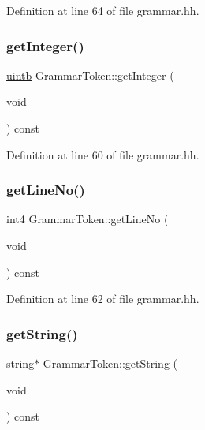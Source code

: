 Definition at line 64 of file grammar.\+hh.

\mbox{\label{class_grammar_token_a69d5c6bd5a21ce2d08a3c7152cf1042f}} 
\subsubsection{\texorpdfstring{getInteger()}{getInteger()}}
{\footnotesize\ttfamily \mbox{\hyperlink{types_8h_a2db313c5d32a12b01d26ac9b3bca178f}{uintb}} Grammar\+Token\+::get\+Integer (\begin{DoxyParamCaption}\item[{void}]{ }\end{DoxyParamCaption}) const\hspace{0.3cm}{\ttfamily [inline]}}



Definition at line 60 of file grammar.\+hh.

\mbox{\label{class_grammar_token_adf9f3d1a7dec07c74cd17bf47b3860fa}} 
\subsubsection{\texorpdfstring{getLineNo()}{getLineNo()}}
{\footnotesize\ttfamily int4 Grammar\+Token\+::get\+Line\+No (\begin{DoxyParamCaption}\item[{void}]{ }\end{DoxyParamCaption}) const\hspace{0.3cm}{\ttfamily [inline]}}



Definition at line 62 of file grammar.\+hh.

\mbox{\label{class_grammar_token_a977abb111592f4f323826e9ded98b125}} 
\subsubsection{\texorpdfstring{getString()}{getString()}}
{\footnotesize\ttfamily string$\ast$ Grammar\+Token\+::get\+String (\begin{DoxyParamCaption}\item[{void}]{ }\end{DoxyParamCaption}) const\hspace{0.3cm}{\ttfamily [inline]}}




